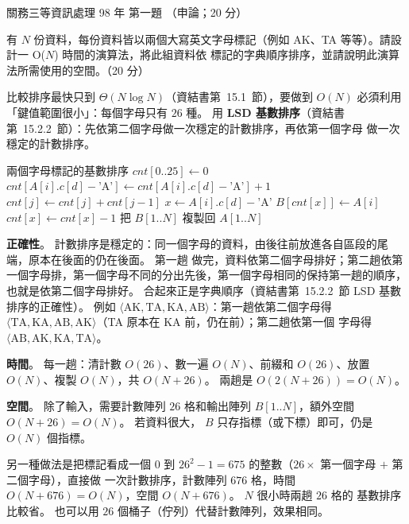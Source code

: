 \begin{pastexam}[label={px:gw3-098-ds-01}]{關務三等資訊處理 98 年 第一題}
（申論；20 分）

有 $N$ 份資料，每份資料皆以兩個大寫英文字母標記（例如 AK、TA 等等）。請設計一 O($N$) 時間的演算法，將此組資料依
標記的字典順序排序，並請說明此演算法所需使用的空間。（20 分）
\end{pastexam}

\begin{pastsoln}
比較排序最快只到 $\Theta(N \log N)$（資結書第~15.1~節），要做到 $O(N)$ 必須利用「鍵值範圍很小」：每個字母只有
$26$ 種。 用 \textbf{LSD 基數排序}（資結書第~15.2.2~節）：先依第二個字母做一次穩定的計數排序，再依第一個字母
做一次穩定的計數排序。

\begin{pseudo}{兩個字母標記的基數排序}
 
     
        \State $\mathit{cnt}[0..25] \gets 0$
            \State $\mathit{cnt}[A[i].c[d] - \text{'A'}] \gets \mathit{cnt}[A[i].c[d] - \text{'A'}] + 1$
        \EndFor
         
            \State $\mathit{cnt}[j] \gets \mathit{cnt}[j] + \mathit{cnt}[j-1]$
        \EndFor
         
            \State $x \gets A[i].c[d] - \text{'A'}$
            \State $B[\mathit{cnt}[x]] \gets A[i]$
            \State $\mathit{cnt}[x] \gets \mathit{cnt}[x] - 1$
        \EndFor
        \State 把 $B[1..N]$ 複製回 $A[1..N]$
    \EndFor
\EndProcedure
\end{pseudo}

\textbf{正確性}。 計數排序是穩定的：同一個字母的資料，由後往前放進各自區段的尾端，原本在後面的仍在後面。 第一趟
做完，資料依第二個字母排好；第二趟依第一個字母排，第一個字母不同的分出先後，第一個字母相同的保持第一趟的順序，
也就是依第二個字母排好。 合起來正是字典順序（資結書第~15.2.2~節 LSD 基數排序的正確性）。 例如
$\langle \mathrm{AK}, \mathrm{TA}, \mathrm{KA}, \mathrm{AB} \rangle$：第一趟依第二個字母得
$\langle \mathrm{TA}, \mathrm{KA}, \mathrm{AB}, \mathrm{AK} \rangle$（TA 原本在 KA 前，仍在前）；第二趟依第一個
字母得 $\langle \mathrm{AB}, \mathrm{AK}, \mathrm{KA}, \mathrm{TA} \rangle$。

\textbf{時間}。 每一趟：清計數 $O(26)$、數一遍 $O(N)$、前綴和 $O(26)$、放置 $O(N)$、複製 $O(N)$，共 $O(N + 26)$。
兩趟是 $O(2(N + 26)) = O(N)$。

\textbf{空間}。 除了輸入，需要計數陣列 $26$ 格和輸出陣列 $B[1..N]$，額外空間 $O(N + 26) = O(N)$。 若資料很大，
$B$ 只存指標（或下標）即可，仍是 $O(N)$ 個指標。

另一種做法是把標記看成一個 $0$ 到 $26^2 - 1 = 675$ 的整數（$26 \times$ 第一個字母 $+$ 第二個字母），直接做
一次計數排序，計數陣列 $676$ 格，時間 $O(N + 676) = O(N)$，空間 $O(N + 676)$。 $N$ 很小時兩趟 $26$ 格的
基數排序比較省。 也可以用 $26$ 個桶子（佇列）代替計數陣列，效果相同。
\end{pastsoln}
